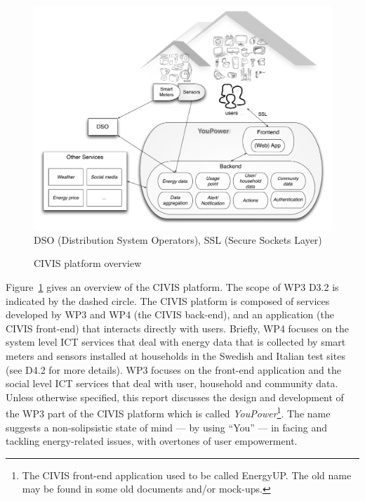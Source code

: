 \begin{figure}
\begin{center}\footnotesize
	\includegraphics[width=.85\textwidth]{img/civis_platform_overview.pdf}\\
	DSO (Distribution System Operators),  SSL (Secure Sockets Layer)
	\caption{CIVIS platform overview}\label{fig:platform}
\end{center}
\end{figure}
%
Figure~\ref{fig:platform} gives an overview of the CIVIS platform. The scope of WP3 D3.2 is indicated by the dashed circle. The CIVIS platform is composed of services developed by WP3 and WP4 (the CIVIS back-end), and an application (the CIVIS front-end) that interacts directly with users. 
Briefly, WP4 focuses on the system level ICT services that deal with energy data that is collected by smart meters and sensors installed at households in the Swedish and Italian test sites (see D4.2 for more details). 
WP3 focuses on the front-end application and the social level ICT services that deal with user, household and community data. Unless otherwise specified, this report discusses the design and development of the WP3 part of the CIVIS platform which is called \textit{YouPower}\footnote{The CIVIS front-end application used to be called EnergyUP. The old name may be found in some old documents and/or mock-ups.}. The name suggests a non-solipsistic state of mind --- by using ``You'' \citep{Crumlish2009} --- in facing and tackling energy-related issues, with overtones of user empowerment. 


